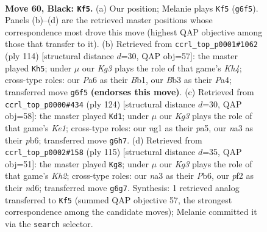 \documentclass[11pt]{article}
\begin{document}
\clearpage

\begin{figure}[p]\centering
\begin{subfigure}{0.46\textwidth}\centering
\resizebox{\linewidth}{!}{%
\newchessgame
\chessboard[
  setfen={8/4P3/p1Q3k1/3P3p/6p1/Nb6/5P1q/5KN1 b - - 0 60},
  showmover=false,
  pgfstyle=straightmove, color=movearrow, markmove={g6-f5}
]}
\caption{}
\end{subfigure}\hfill
\begin{subfigure}{0.46\textwidth}\centering
\resizebox{\linewidth}{!}{%
\newchessgame
\chessboard[
  setfen={7k/7n/2p5/p3pQ2/P3P1PK/8/8/1B2q3 w - - 2 58},
  showmover=false,
  pgfstyle=straightmove, color=movearrow, markmove={h4-h5}
]}
\caption{}
\end{subfigure}
\\[4pt]
\begin{subfigure}{0.46\textwidth}\centering
\resizebox{\linewidth}{!}{%
\newchessgame
\chessboard[
  setfen={6k1/3Q2p1/1p6/p2P1p2/4q3/1P6/5P2/4K3 w - - 14 63},
  showmover=false,
  pgfstyle=straightmove, color=movearrow, markmove={e1-d1}
]}
\caption{}
\end{subfigure}\hfill
\begin{subfigure}{0.46\textwidth}\centering
\resizebox{\linewidth}{!}{%
\newchessgame
\chessboard[
  setfen={8/p5pk/1p1N3p/8/4Q1KP/P7/1P4pq/8 b - - 19 58},
  showmover=false,
  pgfstyle=straightmove, color=movearrow, markmove={h7-g8}
]}
\caption{}
\end{subfigure}
\caption{\textbf{Move 60, Black: \texttt{Kf5}.} (a) Our position; Melanie plays \texttt{Kf5} (\texttt{g6f5}). Panels (b)--(d) are the retrieved master positions whose correspondence most drove this move (highest QAP objective among those that transfer to it). (b) Retrieved from \texttt{ccrl\_top\_p0001\#1062} (ply 114) [structural distance $d$=30, QAP obj=57]: the master played \texttt{Kh5}; under $\mu$ our \emph{Kg3} plays the role of that game's \emph{Kh4}; cross-type roles: our \emph{P}a6 as their \emph{B}b1, our \emph{B}b3 as their \emph{P}a4; transferred move \texttt{g6f5} \textbf{(endorses this move)}. (c) Retrieved from \texttt{ccrl\_top\_p0000\#434} (ply 124) [structural distance $d$=30, QAP obj=58]: the master played \texttt{Kd1}; under $\mu$ our \emph{Kg3} plays the role of that game's \emph{Ke1}; cross-type roles: our \emph{n}g1 as their \emph{p}a5, our \emph{n}a3 as their \emph{p}b6; transferred move \texttt{g6h7}. (d) Retrieved from \texttt{ccrl\_top\_p0002\#158} (ply 115) [structural distance $d$=35, QAP obj=51]: the master played \texttt{Kg8}; under $\mu$ our \emph{Kg3} plays the role of that game's \emph{Kh2}; cross-type roles: our \emph{n}a3 as their \emph{P}b6, our \emph{p}f2 as their \emph{n}d6; transferred move \texttt{g6g7}. Synthesis: 1 retrieved analog transferred to \texttt{Kf5} (summed QAP objective 57, the strongest correspondence among the candidate moves); Melanie committed it via the \texttt{search} selector.}
\label{fig:thought-m119}
\end{figure}
\end{document}
